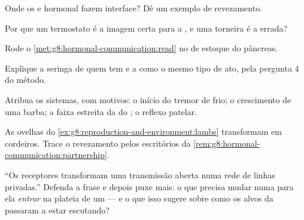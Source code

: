 \begin{exercise}[$\star$]\label{exo:g8:hormonal-communication:6}
Onde os  e hormonal fazem interface? Dê um exemplo de
revezamento.
\end{exercise}

\begin{exercise}[$\star\star$]\label{exo:g8:hormonal-communication:7}
Por que um termostato é a imagem certa para a , e uma
torneira é a errada?
\end{exercise}

\begin{exercise}[$\star\star$]\label{exo:g8:hormonal-communication:8}
Rode o \cref{met:g8:hormonal-communication:read} no  de
estoque do pâncreas.
\end{exercise}

\begin{exercise}[$\star\star$]\label{exo:g8:hormonal-communication:9}
Explique a seringa de quem tem  e a 
como o mesmo tipo de ato, pela pergunta 4 do método.
\end{exercise}

\begin{exercise}[$\star\star$]\label{exo:g8:hormonal-communication:10}
Atribua os sistemas, com motivos: o início do tremor de frio; o
crescimento de uma barba; a faixa estreita da  do ; o
reflexo patelar.
\end{exercise}

\begin{exercise}[$\star\star$]\label{exo:g8:hormonal-communication:11}
As ovelhas do \cref{ex:g8:reproduction-and-environment:lambs}
transformam  em cordeiros. Trace o revezamento pelos escritórios da
\cref{rem:g8:hormonal-communication:partnership}.
\end{exercise}

\begin{exercise}[$\star\star\star$]\label{exo:g8:hormonal-communication:12}
``Os receptores transformam uma transmissão aberta numa rede de linhas
privadas.'' Defenda a frase e depois puxe mais: o que precisa mudar
numa  para ela \emph{entrar} na plateia de um  --- e o
que isso sugere sobre como os alvos da  passaram a estar
escutando?
\end{exercise}

